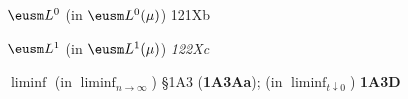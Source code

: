 \indexmedskip
{}

























$\eusm L^0$ (in $\eusm L^0(\mu)$) 121Xb
















$\eusm L^1$ (in $\eusm L^1(\mu)$) {\it 122Xc}














































$\liminf$ (in $\liminf_{n\to\infty}$) \S1A3 ({\bf 1A3Aa});
  (in $\liminf_{t\downarrow 0}$) {\bf 1A3D}


